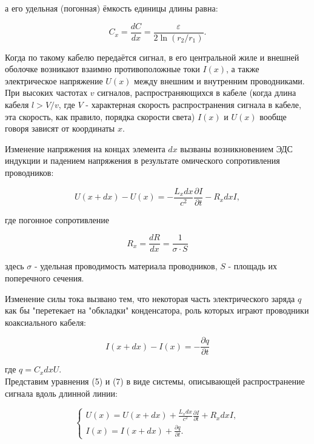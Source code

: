 \documentclass[a4paper,12 pt]{article}
\begin{document}
а его удельная (погонная) ёмкость единицы длины равна:


\begin{equation*}
C_{x}=\frac{d C}{d x}=\frac{\varepsilon}{2 \ln \left(r_{2} / r_{1}\right)} . \tag{4}
\end{equation*}


Когда по такому кабелю передаётся сигнал, в его центральной жиле и внешней оболочке возникают взаимно противоположные токи $I(x)$, а также электрическое напряжение $U(x)$ между внешним и внутренним проводниками. При высоких частотах $v$ сигналов, распространяющихся в кабеле (когда длина кабеля $l>V / v$, где $V$ - характерная скорость распространения сигнала в кабеле, эта скорость, как правило, порядка скорости света) $I(x)$ и $U(x)$ вообще говоря зависят от координаты $x$.

Изменение напряжения на концах элемента $d x$ вызваны возникновением ЭДС индукции и падением напряжения в результате омического сопротивления проводников:


\begin{equation*}
U(x+d x)-U(x)=-\frac{L_{x} d x}{c^{2}} \frac{\partial I}{\partial t}-R_{x} d x I, \tag{5}
\end{equation*}


где погонное сопротивление


\begin{equation*}
R_{x}=\frac{d R}{d x}=\frac{1}{\sigma \cdot S} \tag{6}
\end{equation*}


здесь $\sigma$ - удельная проводимость материала проводников, $S$ - площадь их поперечного сечения.

Изменение силы тока вызвано тем, что некоторая часть электрического заряда $q$ как бы "перетекает на "обкладки" конденсатора, роль которых играют проводники коаксиального кабеля:


\begin{equation*}
I(x+d x)-I(x)=-\frac{\partial q}{\partial t} \tag{7}
\end{equation*}


где $q=C_{x} d x U$.\\
Представим уравнения (5) и (7) в виде системы, описывающей распространение сигнала вдоль длинной линии:

\[
\left\{\begin{array}{l}
U(x)=U(x+d x)+\frac{L_{x} d x}{c^{2}} \frac{\partial I}{\partial t}+R_{x} d x I,  \tag{8}\\
I(x)=I(x+d x)+\frac{\partial q}{\partial t} .
\end{array}\right.
\]
\end{document}
